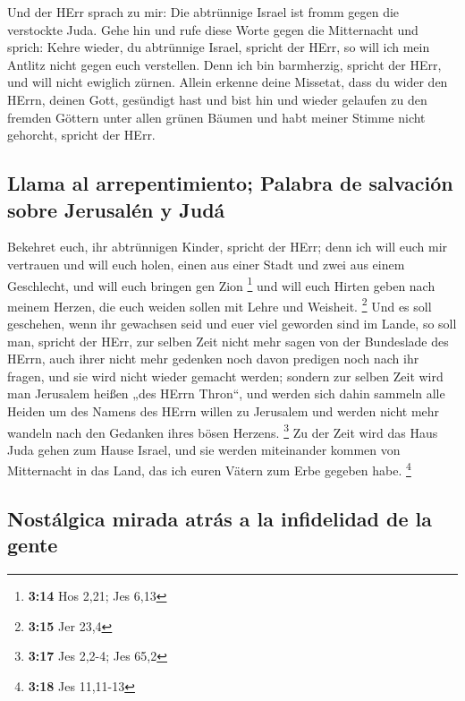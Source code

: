  Und der HErr sprach zu mir: Die abtrünnige Israel ist
fromm gegen die verstockte Juda.  Gehe hin und rufe diese
Worte gegen die Mitternacht und sprich: Kehre wieder, du abtrünnige
Israel, spricht der HErr, so will ich mein Antlitz nicht gegen euch
verstellen. Denn ich bin barmherzig, spricht der HErr, und will nicht
ewiglich zürnen.  Allein erkenne deine Missetat, dass du
wider den HErrn, deinen Gott, gesündigt hast und bist hin und wieder
gelaufen zu den fremden Göttern unter allen grünen Bäumen und habt
meiner Stimme nicht gehorcht, spricht der HErr.

\hypertarget{llama-al-arrepentimiento-palabra-de-salvaciuxf3n-sobre-jerusaluxe9n-y-juduxe1}{%
\subsection{Llama al arrepentimiento; Palabra de salvación sobre
Jerusalén y
Judá}\label{llama-al-arrepentimiento-palabra-de-salvaciuxf3n-sobre-jerusaluxe9n-y-juduxe1}}

 Bekehret euch, ihr abtrünnigen Kinder, spricht der HErr;
denn ich will euch mir vertrauen und will euch holen, einen aus einer
Stadt und zwei aus einem Geschlecht, und will euch bringen gen Zion
\footnote{\textbf{3:14} Hos 2,21; Jes 6,13}  und will
euch Hirten geben nach meinem Herzen, die euch weiden sollen mit Lehre
und Weisheit. \footnote{\textbf{3:15} Jer 23,4}  Und es
soll geschehen, wenn ihr gewachsen seid und euer viel geworden sind im
Lande, so soll man, spricht der HErr, zur selben Zeit nicht mehr sagen
von der Bundeslade des HErrn, auch ihrer nicht mehr gedenken noch davon
predigen noch nach ihr fragen, und sie wird nicht wieder gemacht werden;
 sondern zur selben Zeit wird man Jerusalem heißen „des
HErrn Thron``, und werden sich dahin sammeln alle Heiden um des Namens
des HErrn willen zu Jerusalem und werden nicht mehr wandeln nach den
Gedanken ihres bösen Herzens. \footnote{\textbf{3:17} Jes 2,2-4; Jes
  65,2}  Zu der Zeit wird das Haus Juda gehen zum Hause
Israel, und sie werden miteinander kommen von Mitternacht in das Land,
das ich euren Vätern zum Erbe gegeben habe. \footnote{\textbf{3:18} Jes
  11,11-13}

\hypertarget{nostuxe1lgica-mirada-atruxe1s-a-la-infidelidad-de-la-gente}{%
\subsection{Nostálgica mirada atrás a la infidelidad de la
gente}\label{nostuxe1lgica-mirada-atruxe1s-a-la-infidelidad-de-la-gente}}

